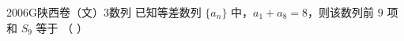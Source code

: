 
\begin{problem}{2006}{G}{陕西卷（文）}{3}{数列}
已知等差数列 $ \{a_n\} $ 中，$ a_1 + a_8 = 8 $，则该数列前 $ 9 $ 项和 $ S_9 $ 等于 （ ）
\begin{choices}
\end{choices}
\end{problem}

\begin{answer}

\end{answer}

\begin{solutions}

\end{solutions}